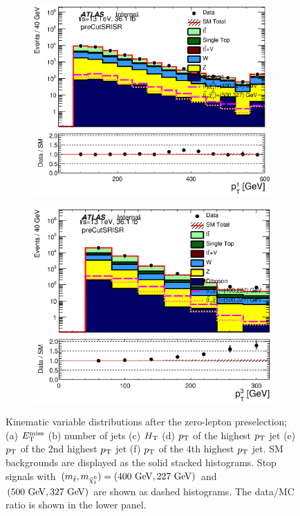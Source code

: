 \begin{figure}[h!]
\begin{center}
\begin{subfigure}[b]{0.40\textwidth}
    	 \includegraphics[width=\textwidth]{figures/plotRegion/JetPt_1__preCutSRISR_log.eps}
                \caption{ }
    \end{subfigure}
    \begin{subfigure}[b]{0.40\textwidth}    
    	 \includegraphics[width=\textwidth]{figures/plotRegion/JetPt_3__preCutSRISR_log.eps}
               \caption{ }
    \end{subfigure}
     \caption[Kinematic variable distributions after the zero-lepton preselection.]{ Kinematic variable distributions after the zero-lepton preselection; (a) $E_{\mathrm{T}}^{\mathrm{miss}}$ (b) number of jets (c) $H_{\mathrm{T}}$ (d) $p_{\mathrm{T}}$ of the highest $p_{\mathrm{T}}$ jet (e) $p_{\mathrm{T}}$ of the 2nd highest $p_{\mathrm{T}}$ jet (f) $p_{\mathrm{T}}$ of the 4th highest $p_{\mathrm{T}}$ jet. SM backgrounds are displayed as the solid stacked histograms.  Stop signals with $(m_{\stop}, m_{\ninoone}) = (400 \gev,227 \gev)$ and $(500 \gev, 327 \gev)$ are shown as dashed histograms.  The data/MC ratio is shown in the lower panel. }
  \label{fig:presel:dist}
    \end{center}
\end{figure}

